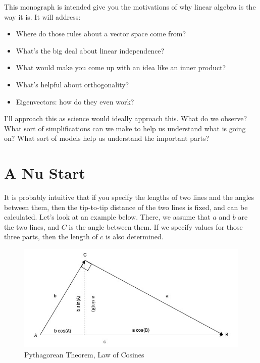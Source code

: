 \documentclass[
]{book}
\providecommand{\tightlist}{%
  \setlength{\itemsep}{0pt}\setlength{\parskip}{0pt}}
\begin{document}
This monograph is intended give you the motivations of why linear algebra is the way it is. It will address:

\begin{itemize}
\tightlist
\item
  Where do those rules about a vector space come from?
\item
  What's the big deal about linear independence?
\item
  What would make you come up with an idea like an inner product?
\item
  What's helpful about orthogonality?
\item
  Eigenvectors: how do they even work?
\end{itemize}

I'll approach this as science would ideally approach this. What do we observe? What sort of simplifications can we make to help us understand what is going on? What sort of models help us understand the important parts?

\hypertarget{a-nu-start}{%
\chapter{A Nu Start}\label{a-nu-start}}

It is probably intuitive that if you specify the lengths of two lines and the angles between them, then the tip-to-tip distance of the two lines is fixed, and can be calculated. Let's look at an example below. There, we assume that \(a\) and \(b\) are the two lines, and \(C\) is the angle between them. If we specify values for those three parts, then the length of \(c\) is also determined.

\begin{figure}

{\centering \includegraphics[width=0.75\linewidth,height=0.75\textheight]{images/LofC-PythThm} 

}

\caption{Pythagorean Theorem, Law of Cosines}\label{fig:unnamed-chunk-1}
\end{figure}
\end{document}
